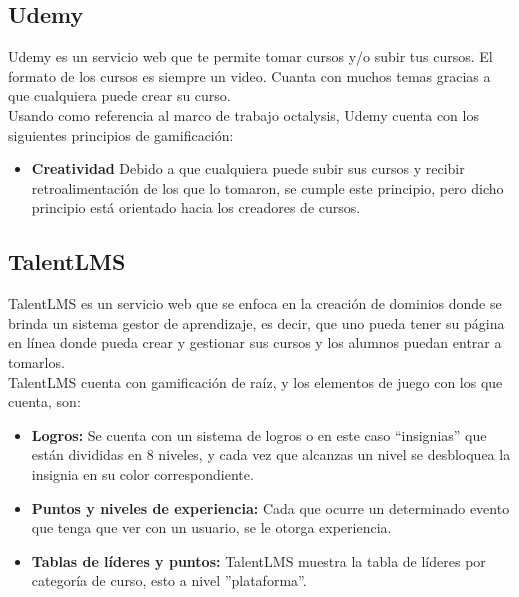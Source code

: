 \begin{multicols*}{2}
\begin{itemize}
    \end{itemize}

\vfill\null
\columnbreak
\subsection*{Udemy}

 Udemy es un servicio web que te permite tomar cursos y/o subir tus cursos.
 El formato de los cursos es siempre un video. Cuanta con muchos temas
 gracias a que cualquiera puede crear su curso.\\

    \noindent Usando como referencia al marco de trabajo octalysis,
    Udemy cuenta con los siguientes principios de gamificación:

    \begin{itemize}
        \item {\bf Creatividad} Debido a que cualquiera puede subir
        sus cursos y recibir retroalimentación de los que lo tomaron,
        se cumple este principio, pero dicho principio está orientado
        hacia los creadores de cursos.

    \end{itemize}



\subsection*{TalentLMS}

 TalentLMS es un servicio web que se enfoca en la creación de dominios donde se
 brinda un sistema gestor de aprendizaje, es decir, que uno pueda tener su página
 en línea donde pueda crear y gestionar sus cursos y los alumnos puedan entrar a tomarlos.\\

    \noindent TalentLMS cuenta con gamificación de raíz,
    y los elementos de juego con los que cuenta, son:

    \begin{itemize}

        \item {\bf Logros:} Se cuenta con un sistema de logros o en este caso
        ``insignias'' que están divididas en 8 niveles, y cada vez que alcanzas
        un nivel se desbloquea la insignia en su color correspondiente.

        \item {\bf Puntos y niveles de experiencia:} Cada que ocurre un
        determinado evento que tenga que ver con un usuario, se le otorga experiencia.

        \item {\bf Tablas de líderes y puntos:} TalentLMS muestra la
        tabla de líderes por categoría de curso, esto a nivel ''plataforma''.

    \end{itemize}

\end{multicols*}



